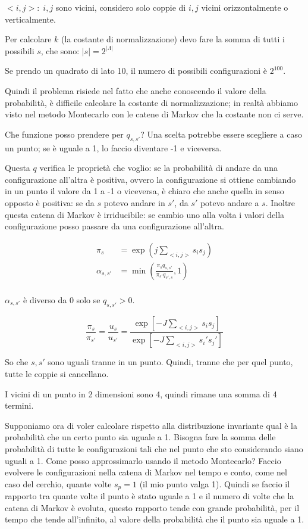 \documentclass[a4paper,12pt]{book}
\begin{document}
$ <i,j>: \; i,j $ sono vicini, considero solo coppie di $ i,j $ vicini orizzontalmente o verticalmente. 

Per calcolare $ k $ (la costante di normalizzazione) devo fare la somma di tutti i possibili $ s $, che sono: $ |s| = 2^{|\Lambda|} $

Se prendo un quadrato di lato 10, il numero di possibili configurazioni è $ 2^{100} $.

Quindi il problema risiede nel fatto che anche conoscendo il valore della probabilità, è difficile calcolare la costante di normalizzazione; in realtà abbiamo visto nel metodo Montecarlo con le catene di Markov che la costante non ci serve.

Che funzione posso prendere per $ q_{s,s'} $? Una scelta potrebbe essere scegliere a caso un punto; se è uguale a 1, lo faccio diventare -1 e viceversa. 

Questa $ q $ verifica le proprietà che voglio: se la probabilità di andare da una configurazione all'altra è positiva, ovvero la configurazione si ottiene cambiando in un punto il valore da 1 a -1 o viceversa, è chiaro che anche quella in senso opposto è positiva: se da $ s $ potevo andare in $ s' $, da $ s' $ potevo andare a $ s $. Inoltre questa catena di Markov è irriducibile: se cambio uno alla volta i valori della configurazione posso passare da una configurazione all'altra.

\begin{align*}
	\pi_s & = \exp (j \sum_{<i,j>} s_i s_j) \\
	\alpha_{s,s'} & = \min \left( \frac{\pi_s q_{s,s'}}{\pi_{s'} q_{s',s}} , 1 \right) \\
\end{align*}

$\alpha_{s,s'}$ è diverso da 0 solo se $ q_{s,s'} > 0 $.%

$$ \frac{\pi_s}{\pi_{s'}} = \frac{u_s}{u_{s'}} = \frac{\exp \left[ -J \sum_{<i,j>} s_i s_j
	 \right]}{ \exp \left[ -J \sum_{<i,j>} s_i' s_j' \right] } $$

So che $ s,s' $ sono uguali tranne in un punto. Quindi, tranne che per quel punto, tutte le coppie si cancellano. 

I vicini di un punto in 2 dimensioni sono 4, quindi rimane una somma di 4 termini.

Supponiamo ora di voler calcolare rispetto alla distribuzione invariante qual è la probabilità che un certo punto sia uguale a 1. Bisogna fare la somma delle probabilità di tutte le configurazioni tali che nel punto che sto considerando siano uguali a 1. Come posso approssimarlo usando il metodo Montecarlo? Faccio evolvere le configurazioni nella catena di Markov nel tempo e conto, come nel caso del cerchio, quante volte $ s_p = 1 $ (il mio punto valga 1). Quindi se faccio il rapporto tra quante volte il punto è stato uguale a 1 e il numero di volte che la catena di Markov è evoluta, questo rapporto tende con grande probabilità, per il tempo che tende all'infinito, al valore della probabilità che il punto sia uguale a 1. 
\end{document}
